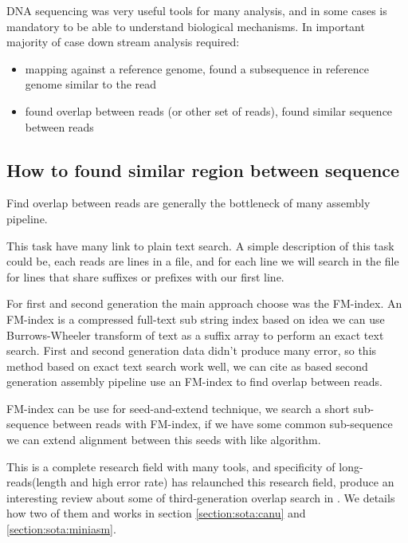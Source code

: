 \documentclass[./main.tex]{subfiles}
\begin{document}
DNA sequencing was very useful tools for many analysis, and in some cases is mandatory to be able to understand biological mechanisms. 
In important majority of case down stream analysis required:
\begin{itemize}
    \item mapping against a reference genome, found a subsequence in reference genome similar to the read
    \item found overlap between reads (or other set of reads), found similar sequence between reads 
\end{itemize}
 
\subsection{How to found similar region between sequence} 


Find overlap between reads are generally the bottleneck of many assembly pipeline.

This task have many link to plain text search. A simple description of this task could be, each reads are lines in a file, and for each line we will search in the file for lines that share suffixes or prefixes with our first line.

For first and second generation the main approach choose was the FM-index\cite{fm-index}. An FM-index is a compressed full-text sub string index based on idea we can use Burrows-Wheeler transform of text as a suffix array to perform an exact text search. First and second generation data didn't produce many error, so this method based on exact text search work well, we can cite  as \OLC based second generation assembly pipeline use an FM-index to find overlap between reads. 

FM-index can be use for seed-and-extend technique, we search a short sub-sequence between reads with FM-index, if we have some common sub-sequence we can extend alignment between this seeds with \citeauthor{smith_waterman}\cite{smith_waterman} like algorithm.

This is a complete research field with many tools, and specificity of long-reads(length and high error rate) has relaunched this research field, \citeauthor{ovl_bench} produce an interesting review about some of third-generation overlap search in \cite{ovl_bench}. We details how two of them \mhap and \minimap works in section \ref{section:sota:canu} and \ref{section:sota:miniasm}.
\end{document}
